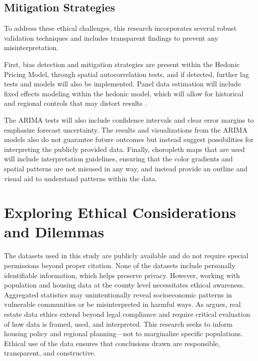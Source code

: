 \documentclass[journal,article,submit,pdftex,moreauthors]{Definitions/mdpi}
\begin{document}
\subsection{Mitigation Strategies}

To address these ethical challenges, this research incorporates several robust validation techniques and includes transparent findings to prevent any misinterpretation.

First, bias detection and mitigation strategies are present within the Hedonic Pricing Model, through spatial autocorrelation tests, and if detected, further lag tests and models will also be implemented. Panel data estimation will include fixed effects modeling within the hedonic model, which will allow for historical and regional controls that may distort results \citep{torresreyna_2010_getting}.

The ARIMA tests will also include confidence intervals and clear error margins to emphasize forecast uncertainty. The results and visualizations from the ARIMA models also do not guarantee future outcomes but instead suggest possibilities for interpreting the publicly provided data. Finally, choropleth maps that are used will include interpretation guidelines, ensuring that the color gradients and spatial patterns are not misused in any way, and instead provide an outline and visual aid to understand patterns within the data.
 


\section{Exploring Ethical Considerations and Dilemmas}

The datasets used in this study are publicly available and do not require special permissions beyond proper citation. None of the datasets include personally identifiable information, which helps preserve privacy. However, working with population and housing data at the county level necessitates ethical awareness. Aggregated statistics may unintentionally reveal socioeconomic patterns in vulnerable communities or be misinterpreted in harmful ways. As \citet{brinkmann_2009_putting} argues, real estate data ethics extend beyond legal compliance and require critical evaluation of how data is framed, used, and interpreted. This research seeks to inform housing policy and regional planning—not to marginalize specific populations. Ethical use of the data ensures that conclusions drawn are responsible, transparent, and constructive. 
\end{document}
